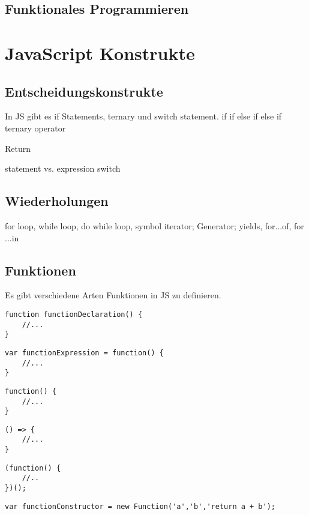 \documentclass{book}
\begin{document}
\section{Funktionales Programmieren}
\chapter{JavaScript Konstrukte}
\section{Entscheidungskonstrukte}
In JS gibt es if Statements, ternary und switch statement.
if
if else
if else if 
ternary operator

Return 

statement vs. expression
switch

\section{Wiederholungen}
for loop, while loop, do while loop, symbol iterator; Generator; yields, for...of, for ...in

\section{Funktionen}
Es gibt verschiedene Arten Funktionen in JS zu definieren. 

\begin{lstlisting}[caption=Array Konstruktor]
function functionDeclaration() {
	//...
}
\end{lstlisting}

\begin{lstlisting}[caption=Array Konstruktor]
var functionExpression = function() {
	//...
}
\end{lstlisting}

\begin{lstlisting}[caption=Anonymous function]
function() {
	//...
}
\end{lstlisting}

\begin{lstlisting}[caption=Arrow function]
() => {
	//...
}
\end{lstlisting}


\begin{lstlisting}[caption=IIFE]
(function() {
	//..
})();
\end{lstlisting}


\begin{lstlisting}[caption=IIFE]
var functionConstructor = new Function('a','b','return a + b');
\end{lstlisting}
\end{document}
